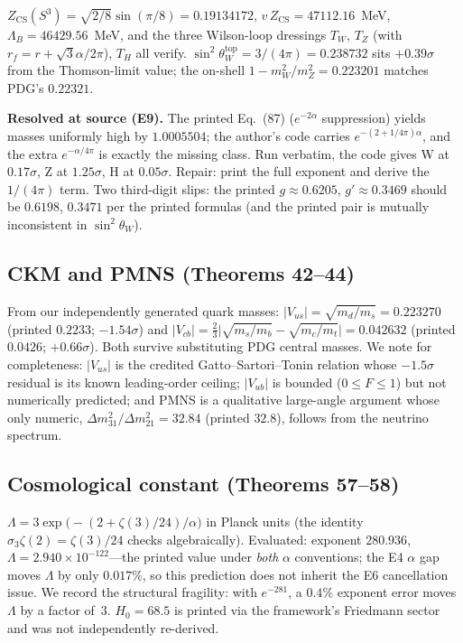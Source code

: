 \documentclass[11pt,letterpaper]{article}
\newcommand{\Sp}[1]{S^{#1}}
\begin{document}
$Z_{\mathrm{CS}}(\Sp{3})=\sqrt{2/8}\sin(\pi/8)=0.19134172$,
$v\,Z_{\mathrm{CS}}=47112.16$~MeV, $\Lambda_B=46429.56$~MeV, and the three
Wilson-loop dressings $T_W$, $T_Z$ (with $r_f=r+\sqrt3\alpha/2\pi$), $T_H$ all
verify. $\sin^2\theta_W^{\mathrm{top}}=3/(4\pi)=0.238732$ sits $+0.39\sigma$
from the Thomson-limit value; the on-shell $1-m_W^2/m_Z^2=0.223201$ matches
PDG's $0.22321$.

\textbf{Resolved at source (E9).} The printed Eq.~(87) ($e^{-2\alpha}$
suppression) yields masses uniformly high by $1.0005504$; the author's code
carries $e^{-(2+1/4\pi)\alpha}$, and the extra $e^{-\alpha/4\pi}$ is exactly
the missing class. Run verbatim, the code gives W at $0.17\sigma$, Z at
$1.25\sigma$, H at $0.05\sigma$. Repair: print the full exponent and derive
the $1/(4\pi)$ term. Two third-digit slips: the printed $g\approx0.6205$,
$g'\approx0.3469$ should be $0.6198$, $0.3471$ per the printed formulas (and
the printed pair is mutually inconsistent in $\sin^2\theta_W$).

\subsection{CKM and PMNS (Theorems 42--44)}
\label{sec:ckm}

From our independently generated quark masses:
$|V_{us}|=\sqrt{m_d/m_s}=0.223270$ (printed $0.2233$; $-1.54\sigma$) and
$|V_{cb}|=\tfrac23\bigl|\sqrt{m_s/m_b}-\sqrt{m_c/m_t}\bigr|=0.042632$
(printed $0.0426$; $+0.66\sigma$). Both survive substituting PDG central
masses. We note for completeness: $|V_{us}|$ is the credited
Gatto--Sartori--Tonin relation whose $-1.5\sigma$ residual is its known
leading-order ceiling; $|V_{ub}|$ is bounded ($0\le F\le1$) but not
numerically predicted; and PMNS is a qualitative large-angle argument whose
only numeric, $\Delta m^2_{31}/\Delta m^2_{21}=32.84$ (printed $32.8$),
follows from the neutrino spectrum.

\subsection{Cosmological constant (Theorems 57--58)}
\label{sec:lambda}

$\Lambda=3\exp\bigl(-(2+\zeta(3)/24)/\alpha\bigr)$ in Planck units (the
identity $\sigma_3\zeta(2)=\zeta(3)/24$ checks algebraically). Evaluated:
exponent $280.936$, $\Lambda=2.940\times10^{-122}$---the printed value under
\emph{both} $\alpha$ conventions; the E4 $\alpha$ gap moves $\Lambda$ by only
$0.017\%$, so this prediction does not inherit the E6 cancellation issue. We
record the structural fragility: with $e^{-281}$, a $0.4\%$ exponent error
moves $\Lambda$ by a factor of~3. $H_0=68.5$ is printed via the framework's
Friedmann sector and was not independently re-derived.
\end{document}
